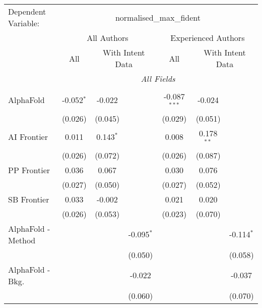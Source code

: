 \begingroup
\centering
\begin{tabular}{lcccccc}
   \tabularnewline \midrule \midrule
   Dependent Variable: & \multicolumn{6}{c}{normalised\_max\_fident}\\
 & \multicolumn{3}{c}{All Authors} & \multicolumn{3}{c}{Experienced Authors} \\
\cmidrule(lr){2-4} \cmidrule(lr){5-7}
 & \multicolumn{1}{c}{All} & \multicolumn{2}{c}{With Intent Data} & \multicolumn{1}{c}{All} & \multicolumn{2}{c}{With Intent Data} \\
\cmidrule(lr){2-2} \cmidrule(lr){3-4} \cmidrule(lr){5-5} \cmidrule(lr){6-7}
 & \multicolumn{6}{c}{\textit{All Fields}} \\ \\
   AlphaFold            & -0.052$^{*}$ & -0.022      &               & -0.087$^{***}$ & -0.024       &   \\   
                        & (0.026)      & (0.045)     &               & (0.029)        & (0.051)      &   \\   
   AI Frontier          & 0.011        & 0.143$^{*}$ &               & 0.008          & 0.178$^{**}$ &   \\   
                        & (0.026)      & (0.072)     &               & (0.026)        & (0.087)      &   \\   
   PP Frontier          & 0.036        & 0.067       &               & 0.030          & 0.076        &   \\   
                        & (0.027)      & (0.050)     &               & (0.027)        & (0.052)      &   \\   
   SB Frontier          & 0.033        & -0.002      &               & 0.021          & 0.020        &   \\   
                        & (0.026)      & (0.053)     &               & (0.023)        & (0.070)      &   \\   
   AlphaFold - Method   &              &             & -0.095$^{*}$  &                &              & -0.114$^{*}$\\   
                        &              &             & (0.050)       &                &              & (0.058)\\   
   AlphaFold - Bkg.     &              &             & -0.022        &                &              & -0.037\\   
                        &              &             & (0.060)       &                &              & (0.070)\\   

\end{tabular}
